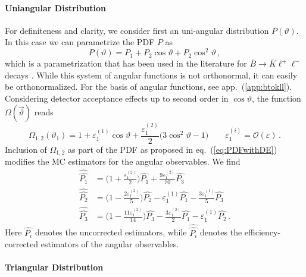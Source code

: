 \documentclass[aps,prd,reprint,nofootinbib,preprintnumbers]{revtex4}
\newcommand{\refapp}[1]{app.~(\ref{app:#1})}
\newcommand{\refeq}[1]{eq.~(\ref{eq:#1})}
\renewcommand{\theta}{\vartheta}
\newcommand{\order}[1]{\mathcal{O}\left({#1}\right)}
\let\eps\varepsilon
\newcommand{\what}[1]{\widehat{#1}}
\newcommand{\wwhat}[1]{\widehat{\widehat{#1}}}
\begin{document}
\paragraph{Uniangular Distribution}
For definiteness and clarity, we consider first an uni-angular distribution $P(\theta)$.
In this case we can parametrize the PDF $P$ as
\begin{equation}
    P(\theta) = P_1 + P_2 \cos\theta + P_2 \cos^2\theta\,,
\end{equation}
which is a parametrization that has been used in the literature for $\bar{B}\to\bar{K}\ell^+\ell^-$ decays \cite{Bobeth:2007dw}.
While this system of angular functions is not orthonormal, it can easily be orthonormalized. For the basis of angular
functions, see \refapp{btokll}.
Considering detector acceptance effects up to second order in $\cos\theta$, the function $\Omega(\vec\theta)$ reads
\begin{equation}
    \Omega_{1,2}(\theta_1) = 1 + \eps_{1}^{(1)} \cos\theta + \frac{\eps_{1}^{(2)}}{2}\big(3 \cos^2\theta - 1\big)\qquad\eps_{1}^{(i)} = \order{\eps}\,.
\end{equation}
Inclusion of $\Omega_{1,2}$ as part of the PDF as proposed in \refeq{PDFwithDE} modifies the MC estimators for the angular observables.
We find
\begin{equation}
\begin{aligned}
    \wwhat{P_1} & = \Big(1 + \frac{\eps_{1}^{(2)}}{2}\Big) \what{P_1} + \frac{9 \eps_{1}^{(2)}}{70} \what{P_3}\\
    \wwhat{P_2} & = \Big(1 - \frac{2 \eps_{1}^{(2)}}{5}\Big) \what{P_2} - \eps_{1}^{(1)} \what{P_1} - \frac{3\eps_{1}^{(1)}}{5} \what{P_3}\\
    \wwhat{P_3} & = \Big(1 - \frac{11\eps_{1}^{(2)}}{14}\Big)\what{P_3} - \frac{3\eps_{1}^{(2)}}{2} \what{P_1} - \eps_{1}^{(1)} \what{P_2}\,.
\end{aligned}
\end{equation}
Here $\what{P_i}$ denotes the uncorrected estimators, while $\wwhat{P_i}$ denotes the efficiency-corrected estimators of the angular observables.\\

\paragraph{Triangular Distribution}

\begin{table*}
    \resizebox{.99\textwidth}{!}{\ensuremath{}}\\[2.5\medskipamount]
    \resizebox{.99\textwidth}{!}{\ensuremath{}}\\[2.5\medskipamount]
    \resizebox{.99\textwidth}{!}{\ensuremath{}}
    \caption{The matrix $N_{ij}$ that appears in \refeq{eff-corrected-est-btokstarll}. Due to spatial
        constraints, we split its display into columns $j=1s,1c,1i,2s,2c,2i$ (top),
        $j=3,4,4i,5,5i,6s$ (middle) and $j=6c,7,7i,8,8i,9$ (bottom).
        \label{tab:eff-corrected-est-btokstarll}
    }
\end{table*}
\end{document}
